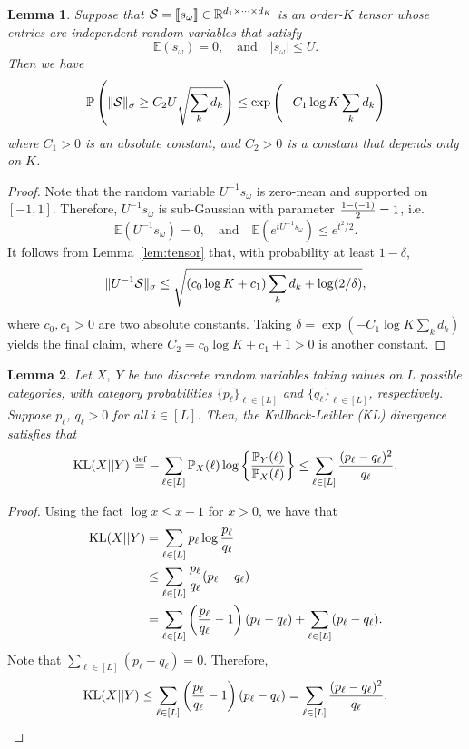 \documentclass[11pt]{article}
\theoremstyle{plain}
\newtheorem{lem}{Lemma}
\theoremstyle{definition}
\begin{document}
\begin{lem} \label{lem:noisytensor}
Suppose that $\mathcal{S}=\llbracket s_{\omega} \rrbracket\in\mathbb{R}^{d_1\times \cdots \times d_K}$ is an order-$K$ tensor whose entries are independent random variables that satisfy
\[
\mathbb{E}(s_{\omega})=0,\quad \text{and}\quad |s_{\omega}|\leq U.
\]
Then we have
\[
\mathbb{P}\left(\lVert\mathcal{S}\rVert_\sigma\geq C_2 U\sqrt{\sum_k d_k} \right)\leq \exp\left(-C_1  \log K \sum_k d_k\right)
\]
where $C_1>0$ is an absolute constant, and $C_2>0$ is a constant that depends only on $K$.
\end{lem}

\begin{proof}  Note that the random variable $U^{-1}s_{\omega}$ is zero-mean and supported on $[-1,1]$. Therefore, $U^{-1}s_{\omega}$ is sub-Gaussian with parameter ${1-(-1)\over 2}=1$, i.e.
\[
\mathbb{E}(U^{-1}s_{\omega})=0,\quad \text{and}\quad \mathbb{E}(e^{tU^{-1}s_{\omega}})\leq e^{t^2/2}.
\]
It follows from Lemma~\ref{lem:tensor} that, with probability at least $1-\delta$,
\[
\lVert U^{-1}\mathcal{S}\rVert_\sigma\leq \sqrt{\left(c_0\log K+c_1\right) \sum_k d_k +\log (2/\delta)},
\]
where $c_0, c_1>0$ are two absolute constants. Taking $\delta=\exp (-C_1\log K \sum_k d_k)$ yields the final claim, where $C_2=c_0\log K+c_1+1>0$ is another constant.
\end{proof}


\begin{lem}\label{lem:KLentry} Let $X,\; Y$ be two discrete random variables taking values on $L$ possible categories, with category probabilities $\{p_\ell\}_{\ell\in[L]}$ and $\{q_\ell\}_{\ell\in[L]}$, respectively.  Suppose $p_\ell$, $q_\ell>0$ for all $i\in[L]$. Then, the Kullback-Leibler (KL) divergence satisfies that
\[
\text{KL}(X||Y)\stackrel{\text{def}}{=}-\sum_{\ell\in[L]}\mathbb{P}_X(\ell)\log\left\{{\mathbb{P}_Y(\ell)\over \mathbb{P}_X(\ell)}\right\} \leq \sum_{\ell \in [L]}{(p_\ell-q_\ell)^2 \over q_\ell}.
\]
\end{lem}
\begin{proof} Using the fact $\log x\leq x-1$ for $x>0$, we have that
\begin{align}\label{eq:KL}
\text{KL}(X||Y)&=\sum_{\ell\in[L]}p_\ell\log{p_\ell\over q_\ell}\\
&\leq \sum_{\ell\in[L]} {p_\ell\over q_\ell}(p_\ell-q_\ell)\\
&=\sum_{\ell\in[L]} \left({p_\ell\over q_\ell }- 1\right)(p_\ell-q_\ell)+ \sum_{\ell\in[L]} (p_\ell-q_\ell).
\end{align}
Note that $\sum_{\ell\in[L]}(p_\ell-q_\ell)=0$. Therefore,
\[
\text{KL}(X||Y)\leq \sum_{\ell\in[L]}\left( {p_\ell\over q_\ell}-1\right)\left(p_\ell-q_\ell\right)=\sum_{\ell\in[L]}{(p_\ell-q_\ell)^2\over q_\ell}.
\]
\end{proof}
\end{document}
